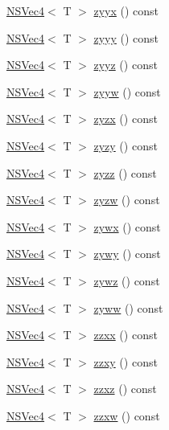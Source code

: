 \begin{DoxyCompactItemize}
\item 
\hyperlink{structNSVec4}{N\-S\-Vec4}$<$ T $>$ \hyperlink{structNSVec4_a7db6af9a0b7bdc1fb4c82f4b4b250584}{zyyx} () const 
\item 
\hyperlink{structNSVec4}{N\-S\-Vec4}$<$ T $>$ \hyperlink{structNSVec4_aba49b22cfac5a2c6f3ba4f6239fab9f9}{zyyy} () const 
\item 
\hyperlink{structNSVec4}{N\-S\-Vec4}$<$ T $>$ \hyperlink{structNSVec4_aee3d029af20341f89f95b3405015fdfb}{zyyz} () const 
\item 
\hyperlink{structNSVec4}{N\-S\-Vec4}$<$ T $>$ \hyperlink{structNSVec4_ab486fa190c601dd307ea2a41122b6ab8}{zyyw} () const 
\item 
\hyperlink{structNSVec4}{N\-S\-Vec4}$<$ T $>$ \hyperlink{structNSVec4_a25bfffdd4c05145324f1250e3937bca2}{zyzx} () const 
\item 
\hyperlink{structNSVec4}{N\-S\-Vec4}$<$ T $>$ \hyperlink{structNSVec4_ac3dc6e6dbd087fac3515d3dabcbfb028}{zyzy} () const 
\item 
\hyperlink{structNSVec4}{N\-S\-Vec4}$<$ T $>$ \hyperlink{structNSVec4_a1825e52112b8313604a1317632ab9a3f}{zyzz} () const 
\item 
\hyperlink{structNSVec4}{N\-S\-Vec4}$<$ T $>$ \hyperlink{structNSVec4_a155c1ca9e0094b63f1c845136d40def1}{zyzw} () const 
\item 
\hyperlink{structNSVec4}{N\-S\-Vec4}$<$ T $>$ \hyperlink{structNSVec4_a005c1bb48a3409ebdd11423a87e4c99e}{zywx} () const 
\item 
\hyperlink{structNSVec4}{N\-S\-Vec4}$<$ T $>$ \hyperlink{structNSVec4_a0d82b340f6c22bde49d8071276af533c}{zywy} () const 
\item 
\hyperlink{structNSVec4}{N\-S\-Vec4}$<$ T $>$ \hyperlink{structNSVec4_a11e4277edc243e1705e426b77ba59626}{zywz} () const 
\item 
\hyperlink{structNSVec4}{N\-S\-Vec4}$<$ T $>$ \hyperlink{structNSVec4_a50807788c48c1e1b9a8e123a70b1d924}{zyww} () const 
\item 
\hyperlink{structNSVec4}{N\-S\-Vec4}$<$ T $>$ \hyperlink{structNSVec4_a154fdc1a8127db81b85ebb8b8fe37325}{zzxx} () const 
\item 
\hyperlink{structNSVec4}{N\-S\-Vec4}$<$ T $>$ \hyperlink{structNSVec4_ae15b52f8385401663272873c4a8b0c68}{zzxy} () const 
\item 
\hyperlink{structNSVec4}{N\-S\-Vec4}$<$ T $>$ \hyperlink{structNSVec4_a3cc28067ee4ed9d48f005c4bfb87f47c}{zzxz} () const 
\item 
\hyperlink{structNSVec4}{N\-S\-Vec4}$<$ T $>$ \hyperlink{structNSVec4_a80b2bdc2614ef7272113b1e6b953f5a4}{zzxw} () const 

\end{DoxyCompactItemize}
